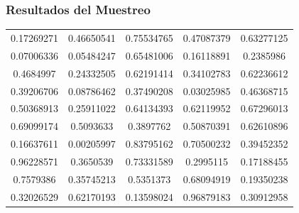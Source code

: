 \documentclass[12pt,a4paper]{article}
\begin{document}
    \subsubsection{Resultados del Muestreo}
        \begin{center}
            \begin{tabular}{ccccc}
                0.17269271 & 0.46650541 & 0.75534765 & 0.47087379 & 0.63277125 \\
                0.07006336 & 0.05484247 & 0.65481006 & 0.16118891 & 0.2385986  \\
                0.4684997  & 0.24332505 & 0.62191414 & 0.34102783 & 0.62236612 \\
                0.39206706 & 0.08786462 & 0.37490208 & 0.03025985 & 0.46368715 \\
                0.50368913 & 0.25911022 & 0.64134393 & 0.62119952 & 0.67296013 \\
                0.69099174 & 0.5093633  & 0.3897762  & 0.50870391 & 0.62610896 \\
                0.16637611 & 0.00205997 & 0.83795162 & 0.70500232 & 0.39452352 \\
                0.96228571 & 0.3650539  & 0.73331589 & 0.2995115  & 0.17188455 \\
                0.7579386  & 0.35745213 & 0.5351373  & 0.68094919 & 0.19350238 \\
                0.32026529 & 0.62170193 & 0.13598024 & 0.96879183 & 0.30912958 \\
            \end{tabular}
        \end{center}
\end{document}

